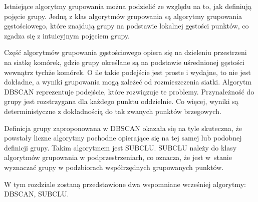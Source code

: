 Istniejące algorytmy grupowania można podzielić ze względu na to, jak definiują pojęcie grupy. Jedną z klas algorytmów grupowania są algorytmy grupowania gęstościowego, które znajdują grupy na podstawie lokalnej gęstości punktów, co zgadza się z intuicyjnym pojęciem grupy.\par

Część algorytmów grupowania gęstościowego opiera się na dzieleniu przestrzeni na siatkę komórek, gdzie grupy określane są na podstawie uśrednionej gęstości wewnątrz tychże komórek. O ile takie podejście jest proste i wydajne, to nie jest dokładne, a wyniki grupowania mogą zależeć od rozmieszczenia siatki. Algorytm DBSCAN reprezentuje podejście, które rozwiązuje te problemy. Przynależność do grupy jest rozstrzygana dla każdego punktu oddzielnie. Co więcej, wyniki są deterministyczne z dokładnością do tak zwanych punktów brzegowych.\par
Definicja grupy zaproponowana w DBSCAN okazała się na tyle skuteczna, że powstały liczne algorytmy pochodne opierające się na tej samej lub podobnej definicji grupy. Takim algorytmem jest SUBCLU. SUBCLU należy do klasy algorytmów grupowania w podprzestrzeniach, co oznacza, że jest \mbox{w stanie} wyznaczać grupy w podzbiorach współrzędnych grupowanych punktów.\par
W tym rozdziale zostaną przedstawione dwa wspomniane wcześniej algorytmy: DBSCAN, SUBCLU.